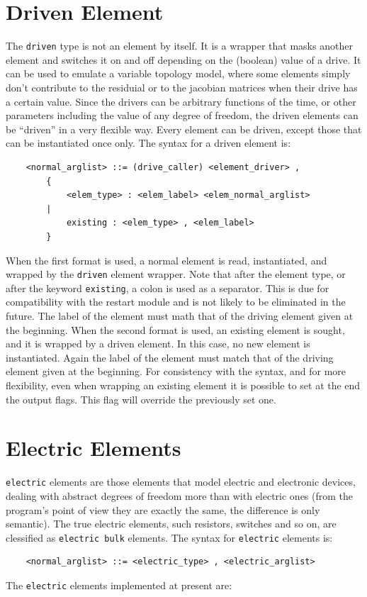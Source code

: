 \section{Driven Element}
The \texttt{driven} type is not an element by itself. It is a wrapper that
masks another element and switches it on and off depending on the (boolean)
value of a drive. It can be used to emulate a variable topology model, where 
some elements simply don't contribute to the residuial or to the jacobian
matrices when their drive has a certain value. Since the drivers can be
arbitrary functions of the time, or other parameters including the value of
any degree of freedom, the driven elements can be ``driven'' in a very
flexible way. Every element can be driven, except those that can be
instantiated once only.
The syntax for a driven element is:
\begin{verbatim}
    <normal_arglist> ::= (drive_caller) <element_driver> ,
        {
            <elem_type> : <elem_label> <elem_normal_arglist> 
        |   
            existing : <elem_type> , <elem_label>
        }
\end{verbatim}
When the first format is used, a normal element is read, instantiated, and
wrapped by the \texttt{driven} element wrapper. Note that after the element type,
or after the keyword \texttt{existing}, a colon is used as a separator.
This is due for compatibility with the restart module and is not likely 
to be eliminated in the future. 
The label of the element must math that of the driving element given at
the beginning.
When the second format is used, an existing element is sought, and it is
wrapped by a driven element. In this case, no new element is instantiated.
Again the label of the element must match that of the driving element given 
at the beginning. For consistency with the syntax, and for more flexibility,
even when wrapping an existing element it is possible to set at the end the
output flags. This flag will override the previously set one.





\section{Electric Elements}
\texttt{electric} elements are those elements that model electric and electronic
devices, dealing with abstract degrees of freedom more than with electric
ones (from the program's point of view they are exactly the same, the
difference is only semantic). The true electric elements, such resistors,
switches and so on, are clessified as \texttt{electric bulk} elements.
The syntax for \texttt{electric} elements is:
\begin{verbatim}
    <normal_arglist> ::= <electric_type> , <electric_arglist>
\end{verbatim}
The \texttt{electric} elements implemented at present are:

